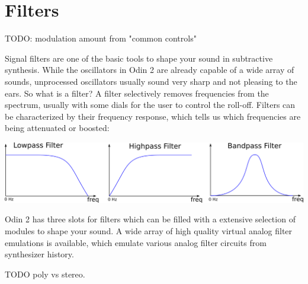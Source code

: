 \chapter{Filters}

TODO: modulation amount from  "common controls"

\label{filters}
Signal filters are one of the basic tools to shape your sound in subtractive synthesis. While the oscillators in Odin 2 are already capable of a wide array of sounds, unprocessed oscillators usually sound very sharp and not pleasing to the ears. So what is a filter? A filter selectively removes frequencies from the spectrum, usually with some dials for the user to control the roll-off. Filters can be characterized by their frequency response, which tells us which frequencies are being attenuated or boosted:

\vspace{5mm}
\begin{center}
    \includegraphics[width=\textwidth]{graphics/filter.png}
\end{center}

\vspace{5mm}

Odin 2 has three slots for filters which can be filled with a extensive selection of modules to shape your sound. A wide array of high quality virtual analog filter emulations is available, which emulate various analog filter circuits from synthesizer history.

TODO poly vs stereo.


